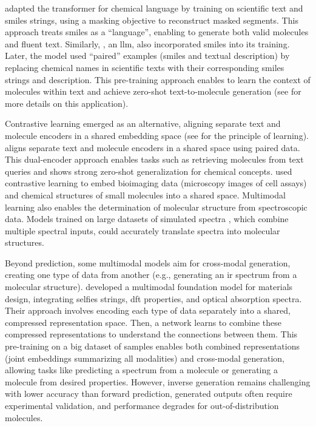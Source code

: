  \autocite{edwards2022translation} adapted the  transformer for chemical language by training on scientific text and \gls{smiles} strings, using a masking objective to reconstruct masked segments. 
This approach treats \gls{smiles} as a \enquote{language}, enabling   to generate both valid molecules and fluent text. 
Similarly,  \autocite{taylor2022galactica}, an \gls{llm}, also incorporated \gls{smiles} into its training. Later, the \autocite{liu2023molxpt0} model used \enquote{paired} examples (\gls{smiles} and textual description) by replacing chemical names in scientific texts with their corresponding \gls{smiles} strings and description. 
This pre-training approach enables  to learn the context of molecules within text and achieve zero-shot text-to-molecule generation (see  for more details on this application).

Contrastive learning emerged as an alternative, aligning separate text and molecule encoders in a shared embedding space (see  for the principle of learning).  \autocite{liu2023multi} aligns separate text and molecule encoders in a shared space using paired data. 
This dual-encoder approach enables tasks such as retrieving molecules from text queries and shows strong zero-shot generalization for chemical concepts.  
 \autocite{sanchez2023cloome}  used contrastive learning to embed bioimaging data (microscopy images of cell assays) and chemical structures of small molecules into a shared space. 
Multimodal learning also enables the determination of molecular structure from spectroscopic data. 
Models trained on large datasets of simulated spectra \autocite{alberts2024unraveling}, which combine multiple spectral inputs, could accurately translate spectra into molecular structures. \autocite{chacko2024spectro,mirza2024elucidating}

Beyond prediction, some multimodal models aim for cross-modal generation, creating one type of data from another (e.g., generating an \gls{ir} spectrum from a molecular structure). \textcite{takeda2023multi} developed a multimodal foundation model for materials design, integrating \gls{selfies} strings, \gls{dft} properties, and optical absorption spectra. 
Their approach involves encoding each type of data separately into a shared, compressed representation space. 
Then, a network learns to combine these compressed representations to understand the connections between them. 
This pre-training on a big dataset of samples enables both combined representations (joint embeddings summarizing all modalities) and cross-modal generation, allowing tasks like predicting a spectrum from a molecule or generating a molecule from desired properties. However, inverse generation remains challenging with lower accuracy than forward prediction, generated outputs often require experimental validation, and performance degrades for out-of-distribution molecules.

